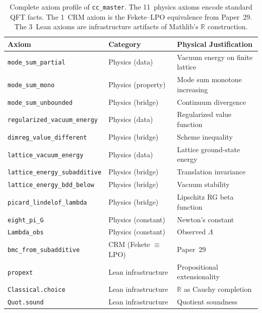 \documentclass[11pt,a4paper]{article}
\theoremstyle{plain}
\theoremstyle{definition}
\newcommand{\RR}{\mathbb{R}}
\newcommand{\LPO}{\ensuremath{\mathrm{LPO}}}
\begin{document}
\begin{table}[ht]
\centering
\begin{tabular}{@{}lll@{}}
\toprule
\textbf{Axiom} & \textbf{Category} & \textbf{Physical Justification} \\
\midrule
\texttt{mode\_sum\_partial} & Physics (data) & Vacuum energy on finite lattice \\
\texttt{mode\_sum\_mono} & Physics (property) & Mode sum monotone increasing \\
\texttt{mode\_sum\_unbounded} & Physics (bridge) & Continuum divergence \\
\texttt{regularized\_vacuum\_energy} & Physics (data) & Regularized value function \\
\texttt{dimreg\_value\_different} & Physics (bridge) & Scheme inequality \\
\texttt{lattice\_vacuum\_energy} & Physics (data) & Lattice ground-state energy \\
\texttt{lattice\_energy\_subadditive} & Physics (bridge) & Translation invariance \\
\texttt{lattice\_energy\_bdd\_below} & Physics (bridge) & Vacuum stability \\
\texttt{picard\_lindelof\_lambda} & Physics (bridge) & Lipschitz RG beta function \\
\texttt{eight\_pi\_G} & Physics (constant) & Newton's constant \\
\texttt{Lambda\_obs} & Physics (constant) & Observed $\Lambda$ \\
\midrule
\texttt{bmc\_from\_subadditive} & CRM (Fekete $\equiv$ LPO) & Paper~29 \\
\midrule
\texttt{propext} & Lean infrastructure & Propositional extensionality \\
\texttt{Classical.choice} & Lean infrastructure & $\RR$ as Cauchy completion \\
\texttt{Quot.sound} & Lean infrastructure & Quotient soundness \\
\bottomrule
\end{tabular}
\caption{Complete axiom profile of \texttt{cc\_master}.
  The 11~physics axioms encode standard QFT facts.  The 1~CRM axiom is
  the Fekete--$\LPO$ equivalence from Paper~29.  The 3~Lean axioms are
  infrastructure artifacts of Mathlib's $\RR$ construction.}
\label{tab:axioms}
\end{table}
\end{document}
